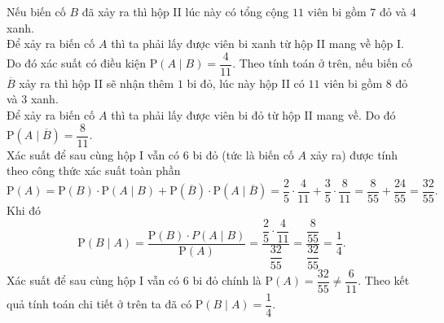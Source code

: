 \begin{ex}
{\begin{center}
		\end{center}
		\begin{itemchoice}
			\itemch Nếu biến cố $B$ đã xảy ra thì hộp II lúc này có tổng cộng $11$ viên bi gồm $7$ đỏ và $4$ xanh.\\
			Để xảy ra biến cố $A$ thì ta phải lấy được viên bi xanh từ hộp II mang về hộp I.\\
			Do đó xác suất có điều kiện $\mathrm{P}(A\mid B)=\dfrac{4}{11}$.
			\itemch Theo tính toán ở trên, nếu biến cố $\overline{B}$ xảy ra thì hộp II sẽ nhận thêm $1$ bi đỏ, lúc này hộp II có $11$ viên bi gồm $8$ đỏ và $3$ xanh.\\
			Để xảy ra biến cố $A$ thì ta phải lấy được viên bi đỏ từ hộp II mang về. Do đó $\mathrm{P}\left(A\mid\overline{B}\right)=\dfrac{8}{11}$.
			\\
			Xác suất để sau cùng hộp I vẫn có $6$ bi đỏ (tức là biến cố $A$ xảy ra) được tính theo công thức xác suất toàn phần
			\[\mathrm{P}(A)=\mathrm{P}(B)\cdot \mathrm{P}(A\mid B)+\mathrm{P}\left(\overline{B}\right)\cdot \mathrm{P}\left(A\mid\overline{B}\right)=\dfrac{2}{5}\cdot\dfrac{4}{11}+\dfrac{3}{5}\cdot\dfrac{8}{11}=\dfrac{8}{55}+\dfrac{24}{55}=\dfrac{32}{55}.\]
			Khi đó
			\[\mathrm{P}(B\mid A)=\dfrac{\mathrm{P}(B)\cdot P(A\mid B)}{\mathrm{P}(A)}=\dfrac{\dfrac{2}{5}\cdot\dfrac{4}{11}}{\dfrac{32}{55}}=\dfrac{\dfrac{8}{55}}{\dfrac{32}{55}}=\dfrac{1}{4}.\]
			\itemch Xác suất để sau cùng hộp I vẫn có $6$ bi đỏ chính là $\mathrm{P}(A)=\dfrac{32}{55}\ne\dfrac{6}{11}$.
			\itemch Theo kết quả tính toán chi tiết ở trên ta đã có $\mathrm{P}(B\mid A)=\dfrac{1}{4}$.
		\end{itemchoice}
	}
\end{ex}
\caukq
